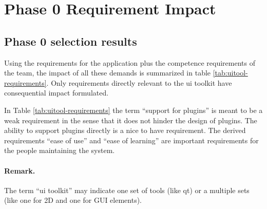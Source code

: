 \section{Phase 0 Requirement Impact}
\label{sec:requirement-impact}

\subsection{Phase 0 selection results}

Using the requirements for the application plus the competence requirements of
the team, the impact of all these demands is summarized in table
\ref{tab:uitool-requirements}. Only requirements directly relevant to the ui
toolkit have consequential impact formulated.

In Table \ref{tab:uitool-requirements} the term ``support for plugins'' is
meant to be a weak requirement in the sense that it does not hinder the design
of plugins. The ability to support plugins directly is a nice to have
requirement. The derived requirements ``ease of use'' and ``ease of learning''
are important requirements for the people maintaining the system.

\paragraph{Remark.} The term ``ui toolkit'' may indicate one set of tools (like
qt) or a multiple sets (like one for 2D and one for GUI elements).

